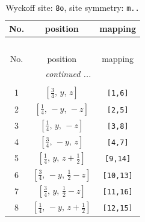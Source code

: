 \documentclass[fleqn,8pt]{jsarticle}
\begin{document}
\begin{longtable}{ccc}
\caption{Wyckoff site: {\tt 8o}, site symmetry: {\tt m..}}
 \\
 \hline \hline
No. & position & mapping \\ \hline \endfirsthead

\multicolumn{2}{l}{\tablename\ \thetable{}} \\
 \hline \hline
No. & position & mapping \\ \hline \endhead

 \hline \hline
\multicolumn{2}{r}{\footnotesize\it continued ...} \\ \endfoot

 \hline \hline
\multicolumn{2}{r}{} \\ \endlastfoot

1 & $\left[ \frac{3}{4},\, y,\, z \right]$ & {\tt [1,6]} \\ \hline
2 & $\left[ \frac{1}{4},\, - y,\, - z \right]$ & {\tt [2,5]} \\ \hline
3 & $\left[ \frac{1}{4},\, y,\, - z \right]$ & {\tt [3,8]} \\ \hline
4 & $\left[ \frac{3}{4},\, - y,\, z \right]$ & {\tt [4,7]} \\ \hline
5 & $\left[ \frac{1}{4},\, y,\, z + \frac{1}{2} \right]$ & {\tt [9,14]} \\ \hline
6 & $\left[ \frac{3}{4},\, - y,\, \frac{1}{2} - z \right]$ & {\tt [10,13]} \\ \hline
7 & $\left[ \frac{3}{4},\, y,\, \frac{1}{2} - z \right]$ & {\tt [11,16]} \\ \hline
8 & $\left[ \frac{1}{4},\, - y,\, z + \frac{1}{2} \right]$ & {\tt [12,15]} \\
\end{longtable}
\renewcommand{\arraystretch}{1.2}
\end{document}
